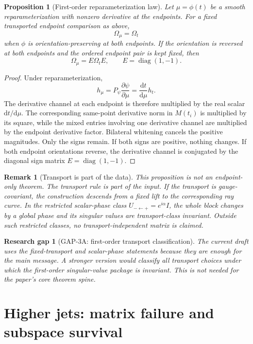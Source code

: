 \documentclass[11pt]{amsart}
\newtheorem{proposition}[theorem]{Proposition}
\newtheorem{remark}[theorem]{Remark}
\newtheorem{gap}[theorem]{Research gap}
\newcommand{\Id}{I}
\newcommand{\dd}{\mathrm d}
\newcommand{\diag}{\operatorname{diag}}
\begin{document}
\begin{proposition}[First-order reparameterization law]
Let \(\mu=\phi(t)\) be a smooth reparameterization with nonzero derivative at
the endpoints. For a fixed transported endpoint comparison as above,
\[
        \Omega_\mu=\Omega_t
\]
when \(\phi\) is orientation-preserving at both endpoints. If the orientation is
reversed at both endpoints and the ordered endpoint pair is kept fixed, then
\[
        \Omega_\mu=E\Omega_tE,\qquad E=\diag(1,-1).
\]
\end{proposition}

\begin{proof}
Under reparameterization,
\[
        h_\mu=P_\psi\frac{\partial\psi}{\partial\mu}
        =
        \frac{\dd t}{\dd\mu}h_t.
\]
The derivative channel at each endpoint is therefore multiplied by the real
scalar \(\dd t/\dd\mu\). The corresponding same-point derivative norm in
\(M(t_i)\) is multiplied by its square, while the mixed entries involving one
derivative channel are multiplied by the endpoint derivative factor. Bilateral
whitening cancels the positive magnitudes. Only the signs remain. If both signs
are positive, nothing changes. If both endpoint orientations reverse, the
derivative channel is conjugated by the diagonal sign matrix
\(E=\diag(1,-1)\).
\end{proof}

\begin{remark}[Transport is part of the data]
This proposition is not an endpoint-only theorem. The transport rule is part of
the input. If the transport is gauge-covariant, the construction descends from
a fixed lift to the corresponding ray curve. In the restricted scalar-phase
class \(U_{-\leftarrow +}=e^{i\alpha}\Id\), the whole block changes by a global
phase and its singular values are transport-class invariant. Outside such
restricted classes, no transport-independent matrix is claimed.
\end{remark}

\begin{gap}[GAP-3A: first-order transport classification]
The current draft uses the fixed-transport and scalar-phase statements because
they are enough for the main message. A stronger version would classify all
transport choices under which the first-order singular-value package is
invariant. This is not needed for the paper's core theorem spine.
\end{gap}

\section{Higher jets: matrix failure and subspace survival}
\end{document}
